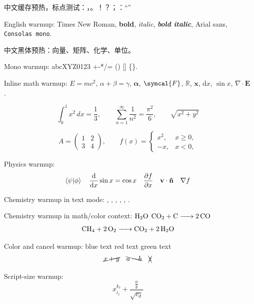


\begin{preview}
中文缓存预热，标点测试：，。！？；：“”

English warmup: Times New Roman, \textbf{bold}, \textit{italic},
\textbf{\textit{bold italic}}, \textsf{Arial sans}, \texttt{Consolas mono}.

{\sffamily 中文黑体预热：向量、矩阵、化学、单位。}

{\ttfamily Mono warmup: abcXYZ0123 +-*/= () [] \{\}.}

Inline math warmup:
$E=mc^2$, $\alpha+\beta=\gamma$, $\symbf{\alpha}$, $\symcal{F}$,
$\mathbb{R}$, $\mathbf{x}$, $\mathrm{d}x$, $\sin x$, $\nabla\cdot\mathbf{E}$.

\[
  \int_0^1 x^2\,dx = \frac{1}{3},\qquad
  \sum_{n=1}^{\infty}\frac{1}{n^2}=\frac{\pi^2}{6},\qquad
  \sqrt{x^2+y^2}
\]

\[
  A =
  \begin{pmatrix}
    1 & 2\\
    3 & 4
  \end{pmatrix},
  \qquad
  f(x)=
  \begin{cases}
    x^2, & x \ge 0,\\
    -x,  & x < 0,
  \end{cases}
\]

Physics warmup:
\[
  \ip{\psi}{\phi}\quad
  \dv{x}\sin x=\cos x\quad
  \pdv{f}{x}\quad
  \vb{v}\cdot\vu{n}\quad
  \nabla f
\]

Chemistry warmup in text mode:
, , , , , .

Chemistry warmup in math/color context:
{\color{blue}$\ce{H2O}$}
{\color{red}$\ce{CO2 + C -> 2CO}$}
\[
  \ce{CH4 + 2O2 -> CO2 + 2H2O}
\]

Color and cancel warmup:
{\color{blue}blue text}
{\color{red}red text}
{\color{green!50!black}green text}
\[
  \cancel{x+y}\quad \bcancel{a-b}\quad \xcancel{z}
\]

Script-size warmup:
\[
  x_{i_j}^{k_\ell} + \frac{\frac{a}{b}}{\sqrt{c_d}}
\]

\end{preview}

